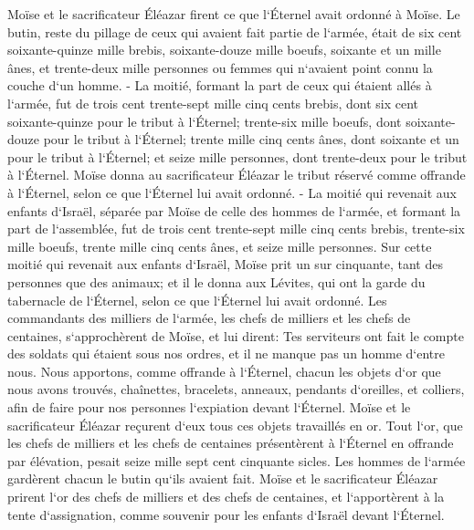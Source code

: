 \verse Moïse et le sacrificateur Éléazar firent ce que l`Éternel avait ordonné à Moïse. 
\verse Le butin, reste du pillage de ceux qui avaient fait partie de l`armée, était de six cent soixante-quinze mille brebis, 
\verse soixante-douze mille boeufs, 
\verse soixante et un mille ânes, 
\verse et trente-deux mille personnes ou femmes qui n`avaient point connu la couche d`un homme. - 
\verse La moitié, formant la part de ceux qui étaient allés à l`armée, fut de trois cent trente-sept mille cinq cents brebis, 
\verse dont six cent soixante-quinze pour le tribut à l`Éternel; 
\verse trente-six mille boeufs, dont soixante-douze pour le tribut à l`Éternel; 
\verse trente mille cinq cents ânes, dont soixante et un pour le tribut à l`Éternel; 
\verse et seize mille personnes, dont trente-deux pour le tribut à l`Éternel. 
\verse Moïse donna au sacrificateur Éléazar le tribut réservé comme offrande à l`Éternel, selon ce que l`Éternel lui avait ordonné. - 
\verse La moitié qui revenait aux enfants d`Israël, séparée par Moïse de celle des hommes de l`armée, 
\verse et formant la part de l`assemblée, fut de trois cent trente-sept mille cinq cents brebis, 
\verse trente-six mille boeufs, 
\verse trente mille cinq cents ânes, 
\verse et seize mille personnes. 
\verse Sur cette moitié qui revenait aux enfants d`Israël, Moïse prit un sur cinquante, tant des personnes que des animaux; et il le donna aux Lévites, qui ont la garde du tabernacle de l`Éternel, selon ce que l`Éternel lui avait ordonné. 
\verse Les commandants des milliers de l`armée, les chefs de milliers et les chefs de centaines, s`approchèrent de Moïse, 
\verse et lui dirent: Tes serviteurs ont fait le compte des soldats qui étaient sous nos ordres, et il ne manque pas un homme d`entre nous. 
\verse Nous apportons, comme offrande à l`Éternel, chacun les objets d`or que nous avons trouvés, chaînettes, bracelets, anneaux, pendants d`oreilles, et colliers, afin de faire pour nos personnes l`expiation devant l`Éternel. 
\verse Moïse et le sacrificateur Éléazar reçurent d`eux tous ces objets travaillés en or. 
\verse Tout l`or, que les chefs de milliers et les chefs de centaines présentèrent à l`Éternel en offrande par élévation, pesait seize mille sept cent cinquante sicles. 
\verse Les hommes de l`armée gardèrent chacun le butin qu`ils avaient fait. 
\verse Moïse et le sacrificateur Éléazar prirent l`or des chefs de milliers et des chefs de centaines, et l`apportèrent à la tente d`assignation, comme souvenir pour les enfants d`Israël devant l`Éternel. 

